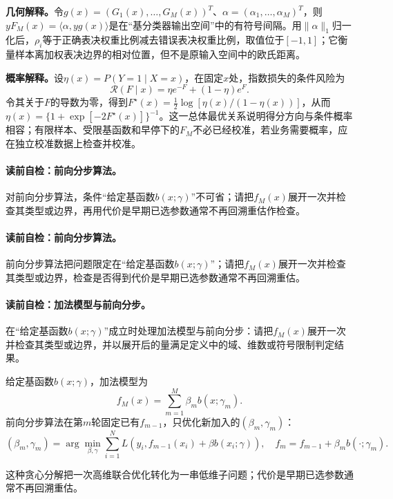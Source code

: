 \textbf{几何解释。}令$g(x)=(G_1(x),\ldots,G_M(x))^T$、$\alpha=(\alpha_1,\ldots,\alpha_M)^T$，则$yF_M(x)=\langle\alpha,yg(x)\rangle$是在“基分类器输出空间”中的有符号间隔。用$\lVert\alpha\rVert_1$归一化后，$\rho_i$等于正确表决权重比例减去错误表决权重比例，取值位于$[-1,1]$；它衡量样本离加权表决边界的相对位置，但不是原输入空间中的欧氏距离。

\textbf{概率解释。}设$\eta(x)=P(Y=1\mid X=x)$，在固定$x$处，指数损失的条件风险为
\[
\mathcal R(F\mid x)=\eta e^{-F}+(1-\eta)e^F.
\]
令其关于$F$的导数为零，得到$F^\star(x)=\frac12\log[\eta(x)/(1-\eta(x))]$，从而$\eta(x)=\{1+\exp[-2F^\star(x)]\}^{-1}$。这一总体最优关系说明得分方向与条件概率相容；有限样本、受限基函数和早停下的$F_M$不必已经校准，若业务需要概率，应在独立校准数据上检查并校准。


\paragraph{读前自检：前向分步算法。}对前向分步算法，条件“给定基函数$b(x;\gamma)$”不可省；请把$f_M(x)$展开一次并检查其类型或边界，再用代价是早期已选参数通常不再回溯重估作检查。\par
\paragraph{读前自检：前向分步算法。}前向分步算法把问题限定在“给定基函数$b(x;\gamma)$”；请把$f_M(x)$展开一次并检查其类型或边界，检查是否得到代价是早期已选参数通常不再回溯重估。\par

\label{struct:V3-C03-CH16}
\paragraph{读前自检：加法模型与前向分步。}在“给定基函数$b(x;\gamma)$”成立时处理加法模型与前向分步：请把$f_M(x)$展开一次并检查其类型或边界，并以展开后的量满足定义中的域、维数或符号限制判定结果。\par

\begin{definition}[加法模型与前向分步]\label{def:V3-C03-forward-stagewise}
给定基函数$b(x;\gamma)$，加法模型为
\[
f_M(x)=\sum_{m=1}^{M}\beta_mb(x;\gamma_m).
\]
前向分步算法在第$m$轮固定已有$f_{m-1}$，只优化新加入的$(\beta_m,\gamma_m)$：
\[
(\beta_m,\gamma_m)=\arg\min_{\beta,\gamma}
\sum_{i=1}^{N}L\!\left(y_i,f_{m-1}(x_i)+\beta b(x_i;\gamma)\right),
\quad
f_m=f_{m-1}+\beta_mb(\cdot;\gamma_m).
\]
\end{definition}
这种贪心分解把一次高维联合优化转化为一串低维子问题；代价是早期已选参数通常不再回溯重估。

